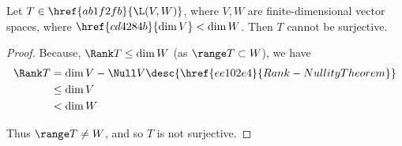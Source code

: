 \label{b4e34e9}

Let $T\in\href{ab1f2fb}{\L(V,W)}$, where $V,W$ are finite-dimensional vector
spaces, where $\href{cd4284b}{\dim V}<\dim W$. Then $T$ cannot be surjective.

\begin{proof}
  Because, $\Rank T\leq\dim W$ (as $\range T\subset W$), we have
  \begin{align*}
    \Rank T &=\dim V-\Null V\desc{\href{ee102e4}{Rank-Nullity Theorem}} \\
            &\leq\dim V                                                 \\
            &<\dim W
  \end{align*}

  Thus $\range T\neq W$, and so $T$ is not surjective.
\end{proof}
